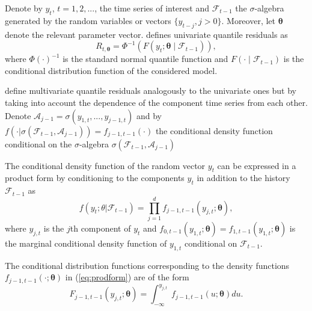 \documentclass[nojss]{jss}
\begin{document}
Denote by $y_t$, $t=1,2,...$,  the time series of interest and $\mathcal{F}_{t-1}$ the $\sigma$-algebra generated by the random variables or vectors $\lbrace y_{t-j}, j > 0 \rbrace$.  Moreover, let $\boldsymbol{\theta}$ denote the relevant parameter vector. \cite{Kalliovirta:2012} defines univariate quantile residuals as
\begin{equation}
R_{t,\boldsymbol{\theta}}=\Phi^{-1}(F(y_t;\boldsymbol{\theta}\mid \mathcal{F}_{t-1})),
\end{equation}
where $\Phi(\cdot)^{-1}$ is the standard normal quantile function and $F(\cdot\mid \mathcal{F}_{t-1})$ is the conditional distribution function of the considered model.

\cite{Kalliovirta+Saikkonen:2010} define multivariate quantile residuals analogously to the univariate ones but by taking into account the dependence of the component time series from each other.  Denote $\mathcal{A}_{j-1}=\sigma(y_{1,t},...,y_{j-1,t})$ and by $f(\cdot|\sigma(\mathcal{F}_{t-1},\mathcal{A}_{j-1}))=f_{j-1,t-1}(\cdot)$ the conditional density function conditional on the $\sigma$-algebra $\sigma(\mathcal{F}_{t-1},\mathcal{A}_{j-1})$

The conditional density function of the random vector $y_t$ can be expressed in a product form by conditioning to the components $y_t$ in addition to the history $\mathcal{F}_{t-1}$ as
\begin{equation}\label{eq:prodform}
f(y_t;\theta|\mathcal{F}_{t-1})=\prod_{j=1}^{d}f_{j-1,t-1}(y_{j,t};\boldsymbol{\theta}),
\end{equation}
where $y_{j,t}$ is the $j$th component of $y_t$ and $f_{0,t-1}(y_{1,t};\boldsymbol{\theta})=f_{1,t-1}(y_{1,t};\boldsymbol{\theta})$ is the marginal conditional density function of $y_{1,t}$ conditional on $\mathcal{F}_{t-1}$.

The conditional distribution functions corresponding to the density functions $f_{j-1,t-1}(\cdot;\boldsymbol{\theta})$ in (\ref{eq:prodform}) are of the form
\begin{equation}
F_{j-1,t-1}(y_{j,t};\boldsymbol{\theta})=\int_{-\infty}^{y_{j,t}} f_{j-1,t-1}(u;\boldsymbol{\theta})du.
\end{equation}
\end{document}
